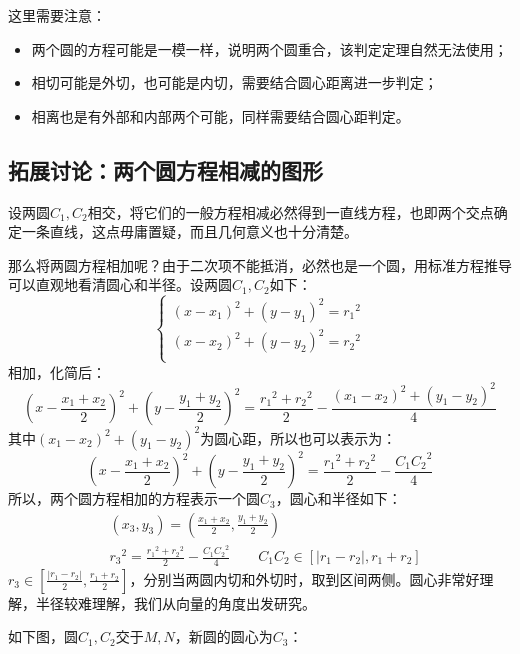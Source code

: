 这里需要注意：
\begin{itemize}
    \item 两个圆的方程可能是一模一样，说明两个圆重合，该判定定理自然无法使用；
    \item 相切可能是外切，也可能是内切，需要结合圆心距离进一步判定；
    \item 相离也是有外部和内部两个可能，同样需要结合圆心距判定。
\end{itemize}

\subsection{拓展讨论：两个圆方程相减的图形}

设两圆$C_1,C_2$相交，将它们的一般方程相减必然得到一直线方程，也即两个交点确定一条直线，这点毋庸置疑，而且几何意义也十分清楚。

那么将两圆方程相加呢？由于二次项不能抵消，必然也是一个圆，用标准方程推导可以直观地看清圆心和半径。设两圆$C_1,C_2$如下：
\[
\begin{cases}
	\left( x-x_1 \right) ^2+\left( y-y_1 \right) ^2={r_1}^2\\
	\left( x-x_2 \right) ^2+\left( y-y_2 \right) ^2={r_2}^2\\
\end{cases}
\]
相加，化简后：
\[
\left( x-\frac{x_1+x_2}{2} \right) ^2+\left( y-\frac{y_1+y_2}{2} \right) ^2=\frac{{r_1}^2+{r_2}^2}{2}-\frac{\left( x_1-x_2 \right) ^2+\left( y_1-y_2 \right) ^2}{4}
\]
其中$\left( x_1-x_2 \right) ^2+\left( y_1-y_2 \right) ^2$为圆心距，所以也可以表示为：
\[
\left( x-\frac{x_1+x_2}{2} \right) ^2+\left( y-\frac{y_1+y_2}{2} \right) ^2=\frac{{r_1}^2+{r_2}^2}{2}-\frac{C_1{C_2}^2}{4}
\]
所以，两个圆方程相加的方程表示一个圆$C_3$，圆心和半径如下：
\begin{align*}
&\left( x_3,y_3 \right) =\left( \frac{x_1+x_2}{2},\frac{y_1+y_2}{2} \right) \\
&{r_3}^2=\frac{{r_1}^2+{r_2}^2}{2}-\frac{C_1{C_2}^2}{4} \qquad C_1C_2\in \left[ \left| r_1-r_2 \right|,r_1+r_2 \right]
\end{align*}
$r_3\in \left[ \frac{\left| r_1-r_2 \right|}{2},\frac{r_1+r_2}{2} \right] $，分别当两圆内切和外切时，取到区间两侧。圆心非常好理解，半径较难理解，我们从向量的角度出发研究。

如下图，圆$C_1,C_2$交于$M,N$，新圆的圆心为$C_3$：

\begin{figure}[h]
\centering
{}
\end{figure}

